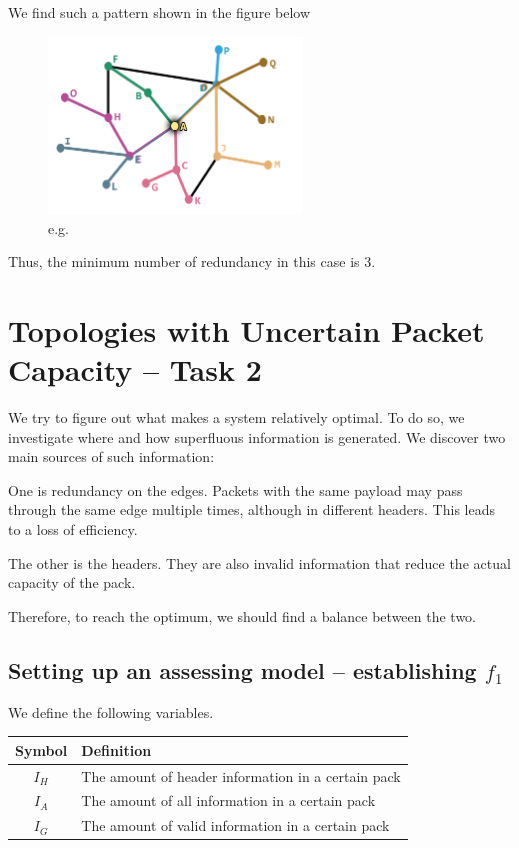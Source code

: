 \documentclass{mcmthesis}
\begin{document}
We find such a pattern shown in the figure below

\begin{figure}[H]
	\centering
	\includegraphics[width = 0.6\textwidth]{figure/fig.1-2.png} 
	\caption{e.g.}
	\label{fig:1-2}
\end{figure}

Thus, the minimum number of redundancy in this case is 3.


\section{Topologies with Uncertain Packet Capacity -- Task 2}

We try to figure out what makes a system relatively optimal. To do so, we investigate where and how superfluous information is generated. We discover two main sources of such information:

One is redundancy on the edges. Packets with the same payload may pass through the same edge multiple times, although in different headers. This leads to a loss of efficiency.

The other is the headers. They are also invalid information that reduce the actual capacity of the pack.

Therefore, to reach the optimum, we should find a balance between the two.

\subsection{Setting up an assessing model -- establishing $f_1$}

We define the following variables.

\begin{center}
	\begin{tabular}{cl}
		\hline
		Symbol & Definition \\
		\hline
		$I_{H}$ & The amount of header information in a certain pack\\ 
		$I_{A}$ & The amount of all information in a certain pack\\
		$I_{G}$ & The amount of valid information in a certain pack\\
		\hline
	\end{tabular}
\end{center}
\end{document}
